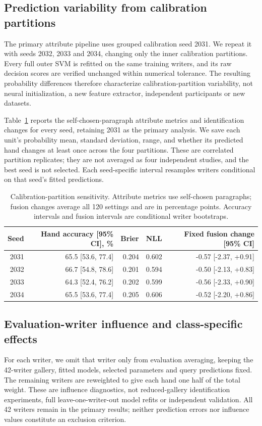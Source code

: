 \documentclass[10pt,a4paper]{article}
\begin{document}
\subsection{Prediction variability from calibration partitions}
The primary attribute pipeline uses grouped calibration seed 2031. We repeat it with seeds 2032, 2033 and 2034, changing only the inner calibration partitions. Every full outer SVM is refitted on the same training writers, and its raw decision scores are verified unchanged within numerical tolerance. The resulting probability differences therefore characterize calibration-partition variability, not neural initialization, a new feature extractor, independent participants or new datasets.

Table~\ref{tab:seeddiag} reports the self-chosen-paragraph attribute metrics and identification changes for every seed, retaining 2031 as the primary analysis. We save each unit's probability mean, standard deviation, range, and whether its predicted hand changes at least once across the four partitions. These are correlated partition replicates; they are not averaged as four independent studies, and the best seed is not selected. Each seed-specific interval resamples writers conditional on that seed's fitted predictions.

\begin{table}[ht]
\centering\small
\caption{Calibration-partition sensitivity. Attribute metrics use self-chosen paragraphs; fusion changes average all 120 settings and are in percentage points. Accuracy intervals and fusion intervals are conditional writer bootstraps.}\label{tab:seeddiag}
\begin{tabular}{rrrrr}\toprule
Seed & Hand accuracy [95\% CI], \% & Brier & NLL & Fixed fusion change [95\% CI]\\\midrule
2031 & 65.5 [53.6, 77.4] & 0.204 & 0.602 & -0.57 [-2.37, +0.91] \\
2032 & 66.7 [54.8, 78.6] & 0.201 & 0.594 & -0.50 [-2.13, +0.83] \\
2033 & 64.3 [52.4, 76.2] & 0.202 & 0.599 & -0.56 [-2.33, +0.90] \\
2034 & 65.5 [53.6, 77.4] & 0.205 & 0.606 & -0.52 [-2.20, +0.86] \\
\bottomrule

\end{tabular}
\end{table}

\subsection{Evaluation-writer influence and class-specific effects}
For each writer, we omit that writer only from evaluation averaging, keeping the 42-writer gallery, fitted models, selected parameters and query predictions fixed. The remaining writers are reweighted to give each hand one half of the total weight. These are influence diagnostics, not reduced-gallery identification experiments, full leave-one-writer-out model refits or independent validation. All 42 writers remain in the primary results; neither prediction errors nor influence values constitute an exclusion criterion.
\end{document}
